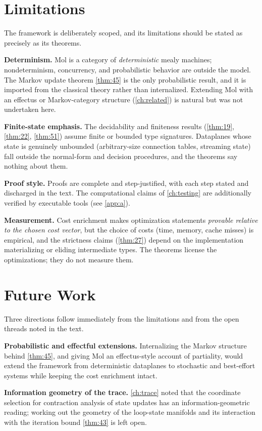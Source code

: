 \section{Limitations}
The framework is deliberately scoped, and its limitations should be stated as precisely as its theorems.

\textbf{Determinism.} Mol is a category of \emph{deterministic} mealy machines; nondeterminism, concurrency, and probabilistic behavior are outside the model. The Markov update theorem \ref{thm:45} is the only probabilistic result, and it is imported from the classical theory rather than internalized. Extending Mol with an effectus or Markov-category structure (\autoref{ch:related}) is natural but was not undertaken here.

\textbf{Finite-state emphasis.} The decidability and finiteness results (\ref{thm:19}, \ref{thm:22}, \ref{thm:51}) assume finite or bounded type signatures. Dataplanes whose state is genuinely unbounded (arbitrary-size connection tables, streaming state) fall outside the normal-form and decision procedures, and the theorems say nothing about them.

\textbf{Proof style.} Proofs are complete and step-justified, with each step stated and discharged in the text. The computational claims of \autoref{ch:testing} are additionally verified by executable tools (see \autoref{app:a}).

\textbf{Measurement.} Cost enrichment makes optimization statements \emph{provable relative to the chosen cost vector}, but the choice of costs (time, memory, cache misses) is empirical, and the strictness claims (\ref{thm:27}) depend on the implementation materializing or eliding intermediate types. The theorems license the optimizations; they do not measure them.

\section{Future Work}
Three directions follow immediately from the limitations and from the open threads noted in the text.

\textbf{Probabilistic and effectful extensions.} Internalizing the Markov structure behind \ref{thm:45}, and giving Mol an effectus-style account of partiality, would extend the framework from deterministic dataplanes to stochastic and best-effort systems while keeping the cost enrichment intact.

\textbf{Information geometry of the trace.} \autoref{ch:trace} noted that the coordinate selection for contraction analysis of state updates has an information-geometric reading; working out the geometry of the loop-state manifolds and its interaction with the iteration bound \ref{thm:43} is left open.

